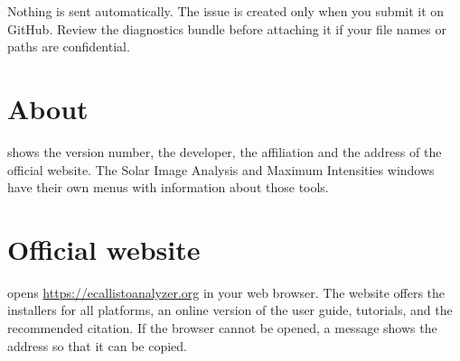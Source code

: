 
\begin{note}
  Nothing is sent automatically. The issue is created only when you submit it on GitHub.
  Review the diagnostics bundle before attaching it if your file names or paths are
  confidential.
\end{note}

\section{About}
\label{sec:about}

 shows the version number, the developer, the affiliation and the
address of the official website. The Solar Image Analysis and Maximum Intensities windows
have their own  menus with information about those tools.

\section{Official website}
\label{sec:website}

 opens \url{https://ecallistoanalyzer.org} in your web browser.
The website offers the installers for all platforms, an online version of the user guide,
tutorials, and the recommended citation. If the browser cannot be opened, a message shows the
address so that it can be copied.
